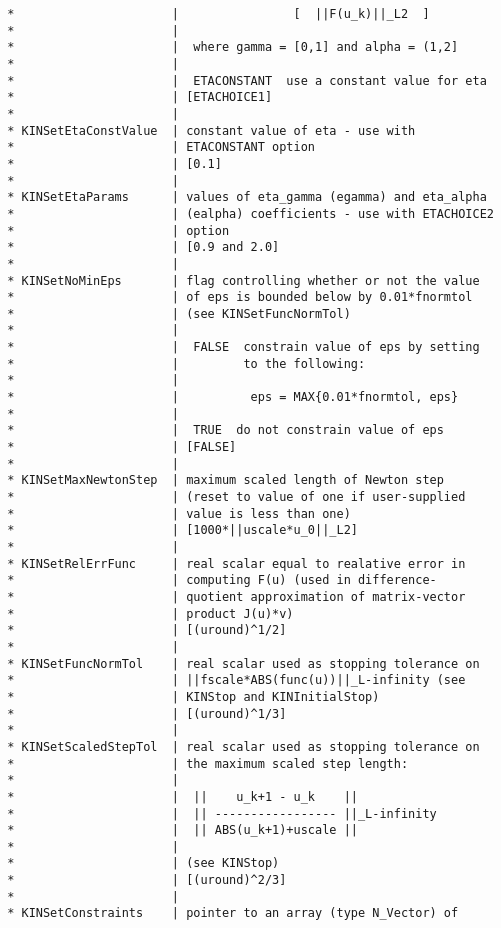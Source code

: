 \documentclass[11pt]{article}
\begin{document}
\begin{verbatim}
 *                      |                [  ||F(u_k)||_L2  ]
 *                      |
 *                      |  where gamma = [0,1] and alpha = (1,2]
 *                      |
 *                      |  ETACONSTANT  use a constant value for eta
 *                      | [ETACHOICE1]
 *                      |
 * KINSetEtaConstValue  | constant value of eta - use with
 *                      | ETACONSTANT option
 *                      | [0.1]
 *                      |
 * KINSetEtaParams      | values of eta_gamma (egamma) and eta_alpha
 *                      | (ealpha) coefficients - use with ETACHOICE2
 *                      | option
 *                      | [0.9 and 2.0]
 *                      |
 * KINSetNoMinEps       | flag controlling whether or not the value
 *                      | of eps is bounded below by 0.01*fnormtol
 *                      | (see KINSetFuncNormTol)
 *                      |
 *                      |  FALSE  constrain value of eps by setting
 *                      |         to the following:
 *                      |
 *                      |          eps = MAX{0.01*fnormtol, eps}
 *                      |
 *                      |  TRUE  do not constrain value of eps
 *                      | [FALSE]
 *                      |
 * KINSetMaxNewtonStep  | maximum scaled length of Newton step
 *                      | (reset to value of one if user-supplied
 *                      | value is less than one)
 *                      | [1000*||uscale*u_0||_L2]
 *                      |
 * KINSetRelErrFunc     | real scalar equal to realative error in
 *                      | computing F(u) (used in difference-
 *                      | quotient approximation of matrix-vector
 *                      | product J(u)*v)
 *                      | [(uround)^1/2]
 *                      |
 * KINSetFuncNormTol    | real scalar used as stopping tolerance on
 *                      | ||fscale*ABS(func(u))||_L-infinity (see
 *                      | KINStop and KINInitialStop)
 *                      | [(uround)^1/3]
 *                      |
 * KINSetScaledStepTol  | real scalar used as stopping tolerance on
 *                      | the maximum scaled step length:
 *                      |
 *                      |  ||    u_k+1 - u_k    ||
 *                      |  || ----------------- ||_L-infinity
 *                      |  || ABS(u_k+1)+uscale ||
 *                      |
 *                      | (see KINStop)
 *                      | [(uround)^2/3]
 *                      |
 * KINSetConstraints    | pointer to an array (type N_Vector) of

\end{verbatim}
\end{document}
